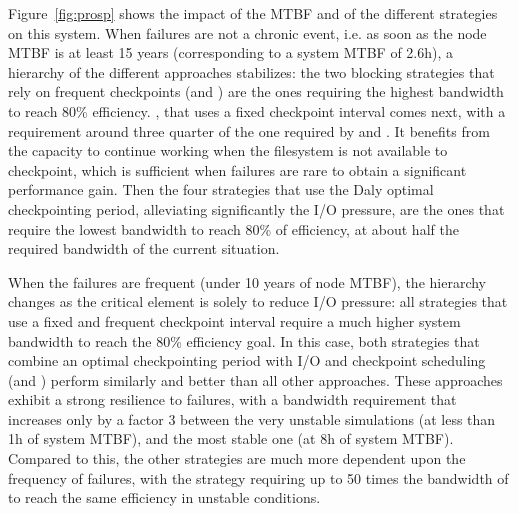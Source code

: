 Figure~\ref{fig:prosp} shows the impact of the MTBF and of the
different strategies on this system. When failures are not a chronic
event, i.e. as soon as the node MTBF is at least 15 years
(corresponding to a system MTBF of 2.6h), a hierarchy of the different
approaches stabilizes: the two blocking strategies that rely on
frequent checkpoints (\propfixed and \bfifofixed) are the ones
requiring the highest bandwidth to reach 80\%
efficiency. %
\fifofixed, that uses a fixed checkpoint interval comes next, with a
requirement around three quarter of the one required by \propfixed and
\fifofixed. It benefits from the capacity to continue working when the
filesystem is not available to checkpoint, which is sufficient when
failures are rare to obtain a significant performance
gain. %
Then the four strategies that use the Daly optimal checkpointing
period, alleviating significantly the I/O pressure, are the ones that
require the lowest bandwidth to reach 80\% of efficiency, at about
half the required bandwidth of the current
situation. %

When the failures are frequent (under 10 years of node MTBF), the
hierarchy changes as the critical element is solely to reduce I/O
pressure: all strategies that use a fixed and frequent checkpoint
interval require a much higher system bandwidth to reach the 80\%
efficiency goal.  In this case, both strategies that combine an
optimal checkpointing period with I/O and checkpoint scheduling
(\cooperative and \fifodaly) perform similarly and better than all
other approaches. These approaches exhibit a strong resilience to
failures, with a bandwidth requirement that increases only by a factor
3 between the very unstable simulations (at less than 1h of system
MTBF), and the most stable one (at 8h of system MTBF). Compared to
this, the other strategies are much more dependent upon the frequency
of failures, with the \propfixed strategy requiring up to 50 times the
bandwidth of \cooperative to reach the same efficiency in unstable
conditions.

